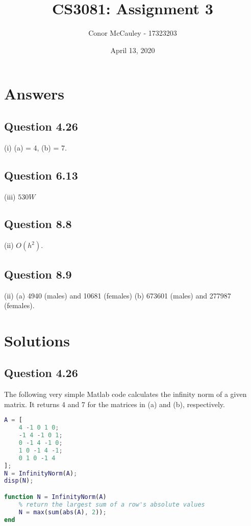 \documentclass[12pt]{article}
\title{CS3081: Assignment 3}
\author{Conor McCauley - 17323203}
\date{April 13, 2020}
\begin{document}
\maketitle

\section*{Answers}

\subsection*{Question 4.26}

\noindent (i) (a) = 4, (b) = 7.

\subsection*{Question 6.13}

\noindent (iii) $530W$

\subsection*{Question 8.8}

\noindent (ii) $O(h^2)$.

\subsection*{Question 8.9}

\noindent (ii) (a) 4940 (males) and 10681 (females) (b) 673601 (males) and 277987 (females).

\section*{Solutions}

\subsection*{Question 4.26}

\indent The following very simple Matlab code calculates the infinity norm of a given matrix. It returns 4 and 7 for the matrices in (a) and (b), respectively.

\begin{lstlisting}[language=Matlab]
A = [
    4 -1 0 1 0;
    -1 4 -1 0 1;
    0 -1 4 -1 0;
    1 0 -1 4 -1;
    0 1 0 -1 4
];
N = InfinityNorm(A);
disp(N);

function N = InfinityNorm(A)
    % return the largest sum of a row's absolute values
    N = max(sum(abs(A), 2));
end
\end{lstlisting}
\end{document}
